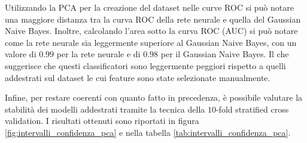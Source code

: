 Utilizzando la PCA per la creazione del dataset nelle curve ROC si può notare
una maggiore distanza tra la curva ROC della rete neurale e quella del Gaussian
Naive Bayes. Inoltre, calcolando l'area sotto la curva ROC (AUC) si può notare
come la rete neurale sia leggermente superiore al Gaussian Naive Bayes, con un
valore di $0.99$ per la rete neurale e di $0.98$ per il Gaussian Naive Bayes. Il
che suggerisce che questi classificatori sono leggermente peggiori rispetto a
quelli addestrati sul dataset le cui feature sono state selezionate manualmente.

Infine, per restare coerenti con quanto fatto in precedenza, è possibile valutare
la stabilità dei modelli addestrati tramite la tecnica della $10$-fold stratified
cross validation. I risultati ottenuti sono riportati in figura \ref{fig:intervalli_confidenza_pca}
e nella tabella \ref{tab:intervalli_confidenza_pca}.

